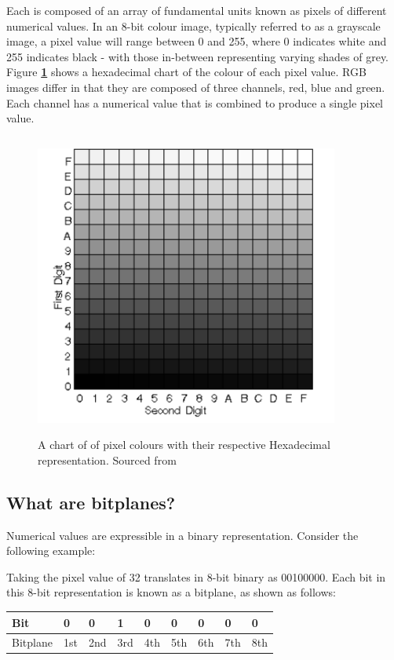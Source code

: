 \documentclass{l4proj}
\begin{document}
Each is composed of an array of fundamental units known as pixels of different numerical values. In an 8-bit colour image, typically referred to as a grayscale image, a pixel value will range between 0 and 255, where 0 indicates white and 255 indicates black - with those in-between representing varying shades of grey. Figure \textbf{\ref{fig:hex_chart}} shows a hexadecimal chart of the colour of each pixel value. RGB images differ in that they are composed of three channels, red, blue and green. Each channel has a numerical value that is combined to produce a single pixel value. 

\begin{figure}[!h]
    \centering
    \includegraphics[width=10cm, height=10cm]{images/pixel_hex_chart.png}
    \caption{A chart of of pixel colours with their respective Hexadecimal representation. Sourced from \citet{singh2015steganography}}
    \label{fig:hex_chart}
\end{figure}


\subsection{What are bitplanes?}

Numerical values are expressible in a binary representation. Consider the following example:

Taking the pixel value of 32 translates in 8-bit binary as 00100000. Each bit in this 8-bit representation is known as a bitplane, as shown as follows:

\begin{table}[!h]
\begin{tabular}{|l|l|l|l|l|l|l|l|l|}
\hline
Bit & 0 & 0 & 1 & 0 & 0 & 0 & 0 & 0 \\ \hline
Bitplane & 1st & 2nd & 3rd & 4th & 5th & 6th & 7th & 8th \\ \hline
\end{tabular}
\end{table}
\end{document}
